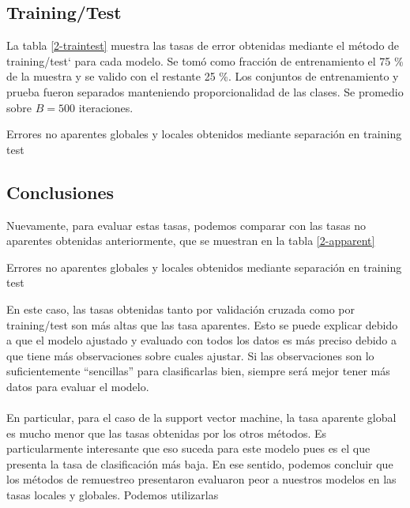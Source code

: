 \documentclass[11pt]{article}
\begin{document}
\subsection{Training/Test}
La tabla \ref{2-traintest} muestra las tasas de error obtenidas mediante el método de training/test` para cada modelo. Se tomó como fracción de entrenamiento el 75 \% de la muestra y se valido con el restante 25 \%. Los conjuntos de entrenamiento y prueba fueron separados manteniendo proporcionalidad de las clases. Se promedio sobre $B=500$ iteraciones.
\begin{table}[H]
    \centering
    
    \caption{Errores no aparentes globales y locales obtenidos mediante separación en training test }
    \label{2-traintest}
\end{table}
\subsection{Conclusiones}
Nuevamente, para evaluar estas tasas, podemos comparar con las tasas no aparentes obtenidas anteriormente, que se muestran en la tabla \ref{2-apparent}
\begin{table}[H]
    \centering
    
    \caption{Errores no aparentes globales y locales obtenidos mediante separación en training test }
    \label{2-apparent}
\end{table}
En este caso, las tasas obtenidas tanto por validación cruzada como por training/test son más altas que las tasa aparentes. Esto se puede explicar debido a que el modelo ajustado y evaluado con todos los datos es más preciso debido a que tiene más observaciones sobre cuales ajustar. Si las observaciones son lo suficientemente ``sencillas'' para clasificarlas bien, siempre será mejor tener más datos para evaluar el modelo.
\\
\\En particular, para el caso de la support vector machine, la tasa aparente global es mucho menor que las tasas obtenidas por los otros métodos. Es particularmente interesante que eso suceda para este modelo pues es el que presenta la tasa de clasificación más baja. En ese sentido, podemos concluir que los métodos de remuestreo presentaron evaluaron peor a nuestros modelos en las tasas locales y globales. Podemos utilizarlas 
\end{document}
